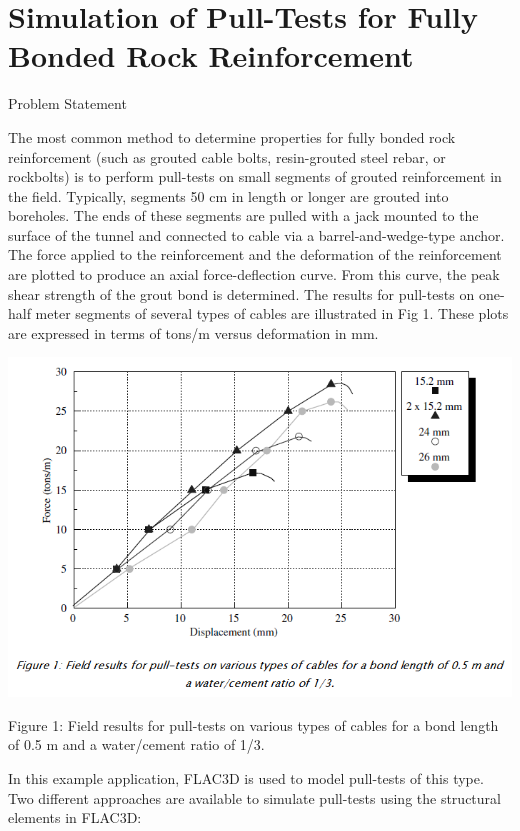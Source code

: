 \documentclass[a4paper, nobind]{templates/ociamthesis}
\begin{document}
\hypertarget{simulation-of-pull-tests-for-fully-bonded-rock-reinforcement}{%
\chapter{Simulation of Pull-Tests for Fully Bonded Rock Reinforcement}\label{simulation-of-pull-tests-for-fully-bonded-rock-reinforcement}}

Problem Statement

The most common method to determine properties for fully bonded rock
reinforcement (such as grouted cable bolts, resin-grouted steel rebar,
or
rockbolts) is to perform pull-tests on small segments of grouted
reinforcement
in the field. Typically, segments 50 cm in length or longer are grouted
into
boreholes. The ends of these segments are pulled with a jack mounted to
the
surface of the tunnel and connected to cable via a barrel-and-wedge-type
anchor.
The force applied to the reinforcement and the deformation of the
reinforcement
are plotted to produce an axial force-deflection curve. From this curve,
the
peak shear strength of the grout bond is determined. The results for
pull-tests
on one-half meter segments of several types of cables are illustrated in
Fig 1. These plots are expressed in terms
of tons/m versus deformation in mm.

\includegraphics[width=1\linewidth]{myfigureeeeee/fig1}

Figure 1: Field results for pull-tests on various types of
cables for a bond length of 0.5 m and a water/cement ratio of 1/3.

In this example application, FLAC3D is used to
model pull-tests of this type. Two different approaches are available to
simulate pull-tests using the structural elements in FLAC3D:
\end{document}
